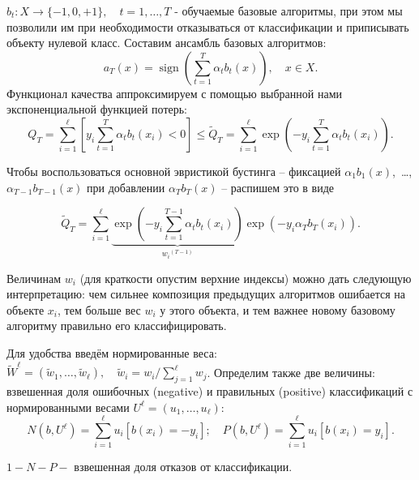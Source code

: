 \noindent$b_t: X \rightarrow \{-1, 0, +1\},\quad t=1, \ldots, T$ - обучаемые базовые алгоритмы, при этом мы позволили им при необходимости отказываться от классификации и приписывать объекту нулевой класс.
Составим ансамбль базовых алгоритмов:
\begin{equation*}
    a_T(x)=\operatorname{sign}\left(\sum_{t=1}^T \alpha_t b_t(x)\right), \quad x \in X.
\end{equation*}
Функционал качества аппроксимируем с помощью выбранной нами экспоненциальной функцией потерь:
\begin{equation*}
    Q_T=\sum_{i=1}^{\ell}\left[y_i \sum_{t=1}^T \alpha_t b_t\left(x_i\right)<0\right]\leqslant \widetilde{Q}_T=\sum_{i=1}^{\ell} {\exp \left(-y_i \sum_{t=1}^{T} \alpha_t b_t\left(x_i\right)\right)}.
\end{equation*}


Чтобы воспользоваться основной эвристикой бустинга
-- фиксацией $\alpha_1 b_1(x)$,~\ldots, $\alpha_{T-1} b_{T-1}(x)$ при добавлении $\alpha_T b_T(x)$ -- распишем это в виде

\begin{equation*}
    \widetilde{Q}_T=\sum_{i=1}^{\ell} \underbrace{\exp \left(-y_i \sum_{t=1}^{T-1} \alpha_t b_t\left(x_i\right)\right)}_{{w_i}^{(T-1)}} \exp \left(-y_i \alpha_T b_T\left(x_i\right)\right).
\end{equation*}

Величинам $w_i$ (для краткости опустим верхние индексы) можно дать следующую интерпретацию: чем сильнее композиция предыдущих алгоритмов ошибается на объекте $x_i$, тем больше вес $w_i$ у этого объекта, и тем важнее новому базовому алгоритму правильно его классифицировать.

Для удобства введём нормированные веса: $\widetilde{W}^{\ell}=\left(\tilde{w}_1, \ldots, \tilde{w}_{\ell}\right), \quad \tilde{w}_i=w_i / \sum_{j=1}^{\ell} w_j$.
Определим также две величины: взвешенная доля ошибочных (negative) и правильных (positive) классификаций с нормированными весами $U^{\ell}=\left(u_1, \ldots, u_{\ell}\right)$:
\begin{equation*}
    N\left(b, U^{\ell}\right)=\sum_{i=1}^{\ell} u_i\left[b\left(x_i\right)=-y_i\right] ; \quad P\left(b, U^{\ell}\right)=\sum_{i=1}^{\ell} u_i\left[b\left(x_i\right)=y_i\right] .
\end{equation*}

$1-N-P-$ взвешенная доля отказов от классификации.

